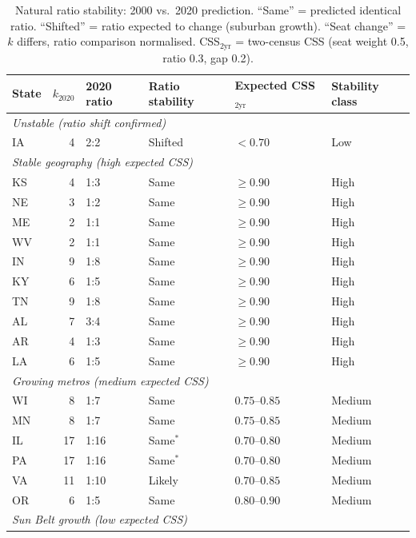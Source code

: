 \begin{table}[h]
\centering
\caption{Natural ratio stability: 2000 vs.\ 2020 prediction.
  ``Same'' = predicted identical ratio.
  ``Shifted'' = ratio expected to change (suburban growth).
  ``Seat change'' = $k$ differs, ratio comparison normalised.
  CSS$_{2\text{yr}}$ = two-census CSS (seat weight 0.5, ratio 0.3, gap 0.2).}
\label{tab:ratio-stability}
\small
\begin{tabular}{l r l l l l}
\toprule
State & $k_{2020}$ & 2020 ratio & Ratio stability & Expected CSS$_{2\text{yr}}$ & Stability class \\
\midrule
\multicolumn{6}{l}{\textit{Unstable (ratio shift confirmed)}} \\
IA  &  4 & 2:2  & Shifted  & $< 0.70$    & Low \\
\midrule
\multicolumn{6}{l}{\textit{Stable geography (high expected CSS)}} \\
KS  &  4 & 1:3  & Same     & $\geq 0.90$ & High \\
NE  &  3 & 1:2  & Same     & $\geq 0.90$ & High \\
ME  &  2 & 1:1  & Same     & $\geq 0.90$ & High \\
WV  &  2 & 1:1  & Same     & $\geq 0.90$ & High \\
IN  &  9 & 1:8  & Same     & $\geq 0.90$ & High \\
KY  &  6 & 1:5  & Same     & $\geq 0.90$ & High \\
TN  &  9 & 1:8  & Same     & $\geq 0.90$ & High \\
AL  &  7 & 3:4  & Same     & $\geq 0.90$ & High \\
AR  &  4 & 1:3  & Same     & $\geq 0.90$ & High \\
LA  &  6 & 1:5  & Same     & $\geq 0.90$ & High \\
\midrule
\multicolumn{6}{l}{\textit{Growing metros (medium expected CSS)}} \\
WI  &  8 & 1:7  & Same     & $0.75$--$0.85$ & Medium \\
MN  &  8 & 1:7  & Same     & $0.75$--$0.85$ & Medium \\
IL  & 17 & 1:16 & Same$^*$ & $0.70$--$0.80$ & Medium \\
PA  & 17 & 1:16 & Same$^*$ & $0.70$--$0.80$ & Medium \\
VA  & 11 & 1:10 & Likely   & $0.70$--$0.85$ & Medium \\
OR  &  6 & 1:5  & Same     & $0.80$--$0.90$ & Medium \\
\midrule
\multicolumn{6}{l}{\textit{Sun Belt growth (low expected CSS)}} \\

\end{tabular}
\end{table}

